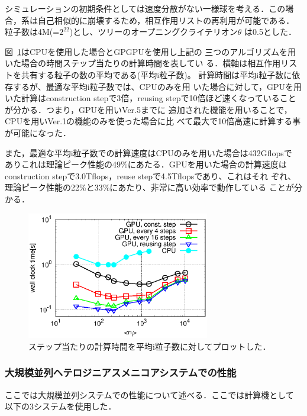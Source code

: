 \documentclass[submit]{ipsj}
\begin{document}
シミュレーションの初期条件としては速度分散がない一様球を考える．この場
合，系は自己相似的に崩壊するため，相互作用リストの再利用が可能である．
粒子数は4M(=$2^{22}$)とし、ツリーのオープニングクライテリオン$\theta$
は0.5とした．

図~\ref{fig:wtime_ngrp_th0.5}はCPUを使用した場合とGPGPUを使用し上記の
三つのアルゴリズムを用いた場合の時間ステップ当たりの計算時間を表してい
る．横軸は相互作用リストを共有する粒子の数の平均である(平均i粒子数)。
計算時間は平均i粒子数に依存するが、最適な平均i粒子数では、CPUのみを用
いた場合に対して，GPUを用いた計算はconstruction stepで3倍，reusing
stepで10倍ほど速くなっていることが分かる．つまり，GPUを用いVer.5までに
追加された機能を用いることで，CPUを用いVer.1の機能のみを使った場合に比
べて最大で10倍高速に計算する事が可能になった．

また，最適な平均i粒子数での計算速度はCPUのみを用いた場合は432Gflopsで
ありこれは理論ピーク性能の49\%にあたる．GPUを用いた場合の計算速度は
construction stepで3.0Tflops，reuse stepで4.5Tflopsであり、これはそれ
ぞれ、理論ピーク性能の22\%と33\%にあたり、非常に高い効率で動作している
ことが分かる．


\begin{figure}[!h]
    \begin{center}
      \includegraphics[width=8cm]{./fig/wtime_ngrp_th0.5.eps}
    \end{center}
    \caption{ステップ当たりの計算時間を平均i粒子数に対してプロットした．}
  \label{fig:wtime_ngrp_th0.5}
\end{figure}


\subsubsection{大規模並列ヘテロジニアスメニコアシステムでの性能}
\label{sec:multiple_node}

ここでは大規模並列システムでの性能について述べる．ここでは計算機として
以下の3システムを使用した．
\end{document}
